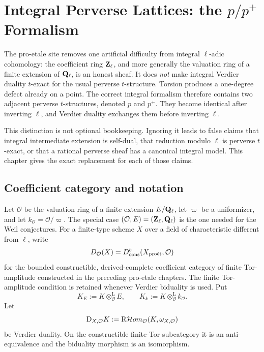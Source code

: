 \chapter{Integral Perverse Lattices: the \texorpdfstring{\(p/p^+\)}{p/p+} Formalism}
\label{chap:integral-perverse-lattices}
\label{chap:integral-perverse}
\providecommand{\op}{\mathrm{op}}
\providecommand{\im}{\operatorname{im}}

The pro-etale site removes one artificial difficulty from integral
\(\ell\)-adic cohomology: the coefficient ring \(\mathbf Z_\ell\), and more generally the
valuation ring of a finite extension of \(\mathbf Q_\ell\), is an honest sheaf.  It does
\emph{not} make integral Verdier duality \(t\)-exact for the usual perverse
\(t\)-structure.  Torsion produces a one-degree defect already on a point.
The correct integral formalism therefore contains two adjacent perverse
\(t\)-structures, denoted \(p\) and \(p^+\).  They become identical after
inverting \(\ell\), and Verdier duality exchanges them before inverting
\(\ell\).

This distinction is not optional bookkeeping.  Ignoring it leads to false
claims that integral intermediate extension is self-dual, that reduction
modulo \(\ell\) is perverse \(t\)-exact, or that a rational perverse sheaf has
a canonical integral model.  This chapter gives the exact replacement for
each of those claims.

\section{Coefficient category and notation}

Let \(\mathcal O\) be the valuation ring of a finite extension \(E/\mathbf Q_\ell\), let
\(\varpi\) be a uniformizer, and let \(k_{\mathcal O}=\mathcal O/\varpi\).
The special case \((\mathcal O,E)=(\mathbf Z_\ell,\mathbf Q_\ell)\) is the one needed for the Weil
conjectures.  For a finite-type scheme \(X\) over a field of characteristic
different from \(\ell\), write
\[
  D_{\mathcal O}(X)=D^b_{\mathrm{cons}}(X_{\mathrm{pro\acute et}},\mathcal O)
\]
for the bounded constructible, derived-complete coefficient category of
finite Tor-amplitude constructed in the preceding pro-etale chapters.  The
finite Tor-amplitude condition is retained whenever Verdier biduality is
used.  Put
\[
  K_E:=K\otimes_{\mathcal O}^{\mathrm L}E,\qquad
  K_k:=K\otimes_{\mathcal O}^{\mathrm L}k_{\mathcal O}.
\]
Let
\[
  \mathrm D_{X,\mathcal O}K
    :=\mathrm R\mathcal Hom_{\mathcal O}(K,\omega_{X,\mathcal O})
\]
be Verdier duality.  On the constructible finite-Tor subcategory it is an
anti-equivalence and the biduality morphism is an isomorphism.

